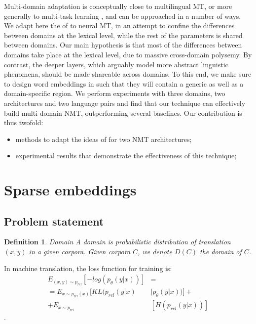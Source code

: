 \documentclass[11pt,a4paper]{article}
\newtheorem{definition}{Definition}[section]
\newcommand{\fyTodo}[1]{\Todo[FY:]{\textcolor{orange}{#1}}}
\newcommand{\fyDone}[1]{\done[FY]\Todo[FY:]{\textcolor{orange}{#1}}}
\begin{document}
Multi-domain adaptation is conceptually close to multilingual MT, or more generally to multi-task learning \cite{Caruana97multitask}, and can be approached in a number of ways. We adapt here the of \cite{Daume07frustratingly} to neural MT, in an attempt to confine the differences between domains at the lexical level, while the rest of the parameters is shared between domains. Our main hypothesis is that most of the differences between domains take place at the lexical level, due to massive cross-domain polysemy. By contrast, the deeper layers, which arguably model more abstract linguistic phenomena, should be made shareable across domains.
To this end, we make sure to design word embeddings in such that they will contain a generic as well as a domain-specific region. We perform experiments with three domains, two architectures and two language pairs and find that our technique can effectively build multi-domain NMT, outperforming several baselines. Our contribution is thus twofold:
\begin{itemize}
\item methods to adapt the ideas of \cite{Daume07frustratingly} for two NMT architectures;
\item experimental results that demonstrate the effectiveness of this technique;
\end{itemize}
\fyTodo{can we train in random order ? can we get away with catastrophic forgetting ?}
\fyTodo{how to analyze the embeddings ? how can we test or claim ?}

\section{Sparse embeddings \label{sec:sparse_embeddings}}
\fyDone{Use meaningful titles throughout}

\subsection{Problem statement}
\fyTodo{Use math for notation, label equations and such}
\begin{definition}{Domain}
\label{def:domain}
A domain is probabilistic distribution of translation $(x,y)$ in a given corpora. Given corpora $C$, we denote $D(C)$ the domain of $C$.
\end{definition}
\fyTodo{We need more: the source, the target, etc}
In machine translation, the loss function for training is:
\begin{equation}\label{eq:1}
\begin{split}
E_{(x,y) \sim p_{rel}}[-log(p_{\theta}(y|x))] &= \\
= E_{x \sim p_{rel}(x)}[KL(p_{rel}(y|x) & \mid p_{\theta}(y|x))] + \\
+ E_{x \sim p_{rel}} &[H(p_{rel}(y|x))]
\end{split}
\end{equation}.
\end{document}
